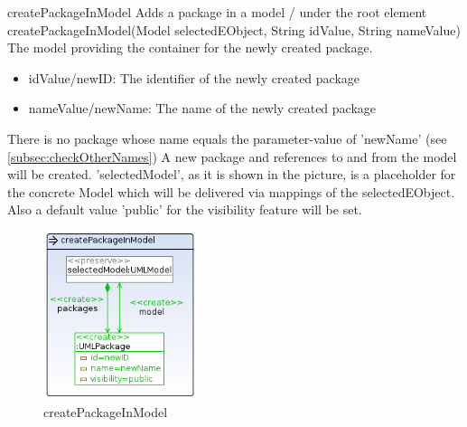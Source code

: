 \op
{createPackageInModel}
{Adds a package in a model / under the root element}
{createPackageInModel(Model selectedEObject, String idValue, String nameValue)}
{The model providing the container for the newly created package.}
{
\begin{itemize}
 \item idValue/newID: The identifier of the newly created package 
 \item nameValue/newName: The name of the newly created package
\end{itemize}
}
{There is no package whose name equals the parameter-value of 'newName' (see
\ref{subsec:checkOtherNames})}
{A new package and references to and from
the model will be created. 'selectedModel', as it is shown in the picture,
is a placeholder for the concrete Model which will be delivered via mappings
of the selectedEObject. Also a default value 'public' for the visibility feature
will be set.} \begin{figure}[H]
  \centering
  \includegraphics[width=0.4\textwidth]{pics/createPackageInModel.png}    
  \caption{createPackageInModel}
  \label{createPackageInModel}  
\end{figure}

